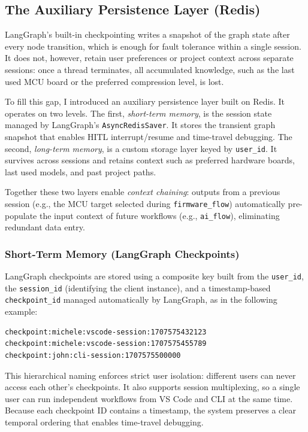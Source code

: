 \subsection{The Auxiliary Persistence Layer (Redis)}
\label{sec:redis_architecture}

LangGraph's built-in checkpointing writes a snapshot of the graph state after every node transition, which is enough for fault tolerance within a single session. It does not, however, retain user preferences or project context across separate sessions: once a thread terminates, all accumulated knowledge, such as the last used MCU board or the preferred compression level, is lost.

To fill this gap, I introduced an auxiliary persistence layer built on Redis. It operates on two levels. The first, \textit{short-term memory}, is the session state managed by LangGraph's \texttt{AsyncRedisSaver}. It stores the transient graph snapshot that enables HITL interrupt/resume and time-travel debugging. The second, \textit{long-term memory}, is a custom storage layer keyed by \texttt{user\_id}. It survives across sessions and retains context such as preferred hardware boards, last used models, and past project paths.

Together these two layers enable \textit{context chaining}: outputs from a previous session (e.g., the MCU target selected during \texttt{firmware\_flow}) automatically pre-populate the input context of future workflows (e.g., \texttt{ai\_flow}), eliminating redundant data entry.

\subsubsection{Short-Term Memory (LangGraph Checkpoints)}

LangGraph checkpoints are stored using a composite key built from the \texttt{user\_id}, the \texttt{session\_id} (identifying the client instance), and a timestamp-based \texttt{checkpoint\_id} managed automatically by LangGraph, as in the following example:

\begin{verbatim}
checkpoint:michele:vscode-session:1707575432123
checkpoint:michele:vscode-session:1707575455789
checkpoint:john:cli-session:1707575500000
\end{verbatim}

This hierarchical naming enforces strict user isolation: different users can never access each other's checkpoints. It also supports session multiplexing, so a single user can run independent workflows from VS Code and CLI at the same time. Because each checkpoint ID contains a timestamp, the system preserves a clear temporal ordering that enables time-travel debugging.

